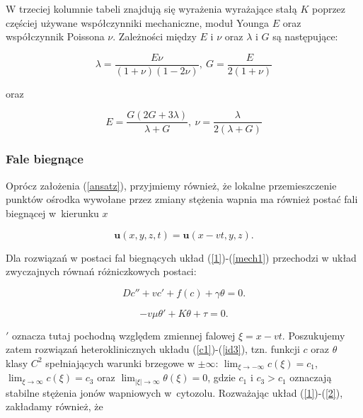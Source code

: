 \medskip 

W trzeciej kolumnie tabeli znajdują się wyrażenia wyrażające stałą $K$ poprzez częściej używane współczynniki mechaniczne, moduł Younga $E$ oraz współczynnik Poissona $\nu$. Zależności między $E$ i $\nu$ oraz $\lambda$ i $G$ są następujące: 

\[ \lambda =\frac{E\nu }{\left(1+\nu \right)(1-2\nu )}, ~ G =\frac{E}{2\left(1+\nu \right)} \]

\noindent oraz     


\[ E = \frac{G (2G +3\lambda )}{\lambda +G }, ~ \nu =\frac{\lambda }{2(\lambda +G )} \]  

\medskip 

\subsubsection{Fale biegnące}  \label{travel}

\medskip 

Oprócz założenia (\ref{ansatz}), przyjmiemy również, że lokalne przemieszczenie punktów ośrodka wywołane przez zmiany stężenia wapnia ma również postać fali biegnącej w~kierunku $x$

\begin{equation} \label{travu} 
\boldsymbol{u}(x,y,z,t) = \boldsymbol{u}(x-vt,y,z). 
\end{equation}

\noindent Dla rozwiązań w postaci fal biegnących układ (\ref{1})-(\ref{mech1}) przechodzi w układ zwyczajnych równań różniczkowych postaci:

\begin{equation} \label{c1} 
D c'' + v c' + f(c) + \gamma \theta = 0. 
\end{equation}

\begin{equation} \label{id3} 
-v \mu \theta' + K \theta + \tau = 0. 
\end{equation}

\noindent $'$ oznacza tutaj pochodną względem zmiennej falowej $\xi = x - vt$. Poszukujemy zatem rozwiązań heteroklinicznych układu (\ref{c1})-(\ref{id3}), tzn. funkcji $c$ oraz $\theta$ klasy $C^2$ spełniających warunki brzegowe w $\pm \infty$: $\lim_{\xi \to -\infty} c(\xi) = c_1$, $\lim_{\xi \to \infty} c(\xi) = c_3$ oraz $\lim_{|\xi| \to \infty} \theta(\xi) = 0$, gdzie $c_1$ i $c_3>c_1$ oznaczają stabilne stężenia jonów wapniowych w~cytozolu. Rozważając układ (\ref{1})-(\ref{2}), zakładamy również, że 

